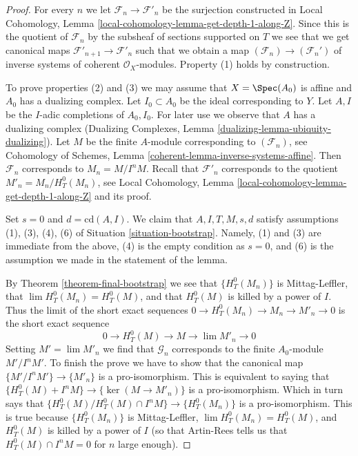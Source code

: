 \begin{proof}
For every $n$ we let $\mathcal{F}_n \to \mathcal{F}'_n$ be the surjection
constructed in
Local Cohomology, Lemma \ref{local-cohomology-lemma-get-depth-1-along-Z}.
Since this is the quotient of $\mathcal{F}_n$ by the subsheaf
of sections supported on $T$ we see that we get canonical maps
$\mathcal{F}'_{n + 1} \to \mathcal{F}'_n$ such that we obtain
a map $(\mathcal{F}_n) \to (\mathcal{F}_n')$
of inverse systems of coherent $\mathcal{O}_X$-modules.
Property (1) holds by construction.

\medskip\noindent
To prove properties (2) and (3) we may assume that $X = \Spec(A_0)$ is
affine and $A_0$ has a dualizing complex. Let $I_0 \subset A_0$ be the
ideal corresponding to $Y$. Let $A, I$ be the $I$-adic completions of
$A_0, I_0$. For later use we observe that $A$ has a dualizing complex
(Dualizing Complexes, Lemma \ref{dualizing-lemma-ubiquity-dualizing}).
Let $M$ be the finite $A$-module corresponding to $(\mathcal{F}_n)$, see
Cohomology of Schemes, Lemma \ref{coherent-lemma-inverse-systems-affine}.
Then $\mathcal{F}_n$ corresponds to $M_n = M/I^nM$. Recall that
$\mathcal{F}'_n$ corresponds to the quotient $M'_n = M_n / H^0_T(M_n)$,
see Local Cohomology, Lemma \ref{local-cohomology-lemma-get-depth-1-along-Z}
and its proof.

\medskip\noindent
Set $s = 0$ and $d = \text{cd}(A, I)$.
We claim that $A, I, T, M, s, d$ satisfy assumptions (1), (3), (4), (6)
of Situation \ref{situation-bootstrap}.
Namely, (1) and (3) are immediate from the above, (4) is
the empty condition as $s = 0$, and (6) is the assumption
we made in the statement of the lemma.

\medskip\noindent
By Theorem \ref{theorem-final-bootstrap} we see that $\{H^0_T(M_n)\}$
is Mittag-Leffler, that $\lim H^0_T(M_n) = H^0_T(M)$, and that
$H^0_T(M)$ is killed by a power of $I$. Thus the
limit of the short exact sequences $0 \to H^0_T(M_n) \to M_n \to M'_n \to 0$
is the short exact sequence
$$
0 \to H^0_T(M) \to M \to \lim M'_n \to 0
$$
Setting $M' = \lim M'_n$ we find that $\mathcal{G}_n$ corresponds to
the finite $A_0$-module $M'/I^nM'$. To finish the prove we have to show
that the canonical map $\{M'/I^nM'\} \to \{M'_n\}$ is a pro-isomorphism.
This is equivalent to saying that
$\{H^0_T(M) + I^nM\} \to \{\ker(M \to M'_n)\}$ is a
pro-isomorphism. Which in turn says that
$\{H^0_T(M)/H^0_T(M) \cap I^nM\} \to \{H^0_T(M_n)\}$
is a pro-isomorphism. This is true because $\{H^0_T(M_n)\}$
is Mittag-Leffler, $\lim H^0_T(M_n) = H^0_T(M)$, and
$H^0_T(M)$ is killed by a power of $I$ (so that Artin-Rees
tells us that $H^0_T(M) \cap I^nM = 0$ for $n$ large enough).
\end{proof}

